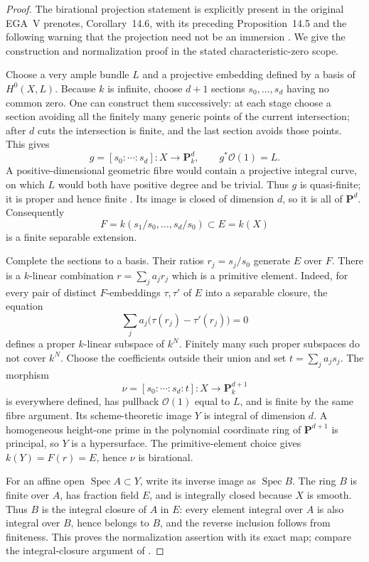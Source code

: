 \begin{proof}
The birational projection statement is explicitly present in the original EGA~V prenotes, Corollary~14.6, with its preceding Proposition~14.5 and the following warning that the projection need not be an immersion \cite[original scan p.89]{AuditGrothendieckEGAVOriginal}. We give the construction and normalization proof in the stated characteristic-zero scope.

Choose a very ample bundle $L$ and a projective embedding defined by a basis of $H^0(X,L)$. Because $k$ is infinite, choose $d+1$ sections $s_0,\ldots,s_d$ having no common zero. One can construct them successively: at each stage choose a section avoiding all the finitely many generic points of the current intersection; after $d$ cuts the intersection is finite, and the last section avoids those points. This gives
\[
 g=[s_0:\cdots:s_d]:X\longrightarrow\mathbf P_k^d,
 \qquad g^*\mathcal O(1)=L.
\]
A positive-dimensional geometric fibre would contain a projective integral curve, on which $L$ would both have positive degree and be trivial. Thus $g$ is quasi-finite; it is proper and hence finite \cite[Tag 02LS, Lemma 37.44.1]{AuditStacksFiniteNormalization}. Its image is closed of dimension $d$, so it is all of $\mathbf P^d$. Consequently
\[
 F=k(s_1/s_0,\ldots,s_d/s_0)\subset E=k(X)
\]
is a finite separable extension.

Complete the sections to a basis. Their ratios $r_j=s_j/s_0$ generate $E$ over $F$. There is a $k$-linear combination $r=\sum_j a_jr_j$ which is a primitive element. Indeed, for every pair of distinct $F$-embeddings $\tau,\tau'$ of $E$ into a separable closure, the equation
\[
 \sum_j a_j\bigl(\tau(r_j)-\tau'(r_j)\bigr)=0
\]
defines a proper $k$-linear subspace of $k^N$. Finitely many such proper subspaces do not cover $k^N$. Choose the coefficients outside their union and set $t=\sum_j a_js_j$. The morphism
\[
 \nu=[s_0:\cdots:s_d:t]:X\longrightarrow\mathbf P_k^{d+1}
\]
is everywhere defined, has pullback $\mathcal O(1)$ equal to $L$, and is finite by the same fibre argument. Its scheme-theoretic image $Y$ is integral of dimension $d$. A homogeneous height-one prime in the polynomial coordinate ring of $\mathbf P^{d+1}$ is principal, so $Y$ is a hypersurface. The primitive-element choice gives $k(Y)=F(r)=E$, hence $\nu$ is birational.

For an affine open $\operatorname{Spec}A\subset Y$, write its inverse image as $\operatorname{Spec}B$. The ring $B$ is finite over $A$, has fraction field $E$, and is integrally closed because $X$ is smooth. Thus $B$ is the integral closure of $A$ in $E$: every element integral over $A$ is also integral over $B$, hence belongs to $B$, and the reverse inclusion follows from finiteness. This proves the normalization assertion with its exact map; compare the integral-closure argument of \cite[Tag 0AB1, Lemma 29.55.8]{AuditStacksFiniteNormalization}.


\end{proof}
